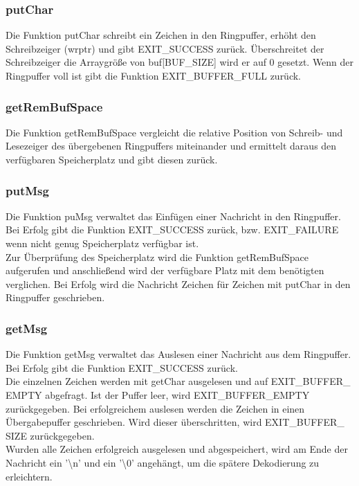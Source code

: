 \documentclass{scrartcl}
\begin{document}
\subsubsection{putChar}
Die Funktion putChar schreibt ein Zeichen in den Ringpuffer, erhöht den Schreibzeiger (wrptr) und gibt EXIT\_SUCCESS zurück.
Überschreitet der Schreibzeiger die Arraygröße von buf[BUF\_SIZE] wird er auf 0 gesetzt. Wenn der Ringpuffer voll ist gibt die Funktion EXIT\_BUFFER\_FULL zurück.



\subsubsection{getRemBufSpace}
Die Funktion getRemBufSpace vergleicht die relative Position von Schreib- und Lesezeiger des übergebenen Ringpuffers miteinander und ermittelt daraus den verfügbaren Speicherplatz und gibt diesen zurück.


\subsubsection{putMsg}
Die Funktion puMsg verwaltet das Einfügen einer Nachricht in den Ringpuffer. Bei Erfolg gibt die Funktion EXIT\_SUCCESS zurück, bzw. EXIT\_FAILURE wenn nicht genug Speicherplatz verfügbar ist. \\
Zur Überprüfung des Speicherplatz wird die Funktion getRemBufSpace aufgerufen und anschließend wird der verfügbare Platz mit dem benötigten verglichen. Bei Erfolg wird die Nachricht Zeichen für Zeichen mit putChar in den Ringpuffer geschrieben.

\subsubsection{getMsg}
Die Funktion getMsg verwaltet das Auslesen einer Nachricht aus dem Ringpuffer. Bei Erfolg gibt die Funktion EXIT\_SUCCESS zurück.\\
Die einzelnen Zeichen werden mit getChar ausgelesen und auf EXIT\_BUFFER\_ EMPTY abgefragt. Ist der Puffer leer, wird EXIT\_BUFFER\_EMPTY zurückgegeben. Bei erfolgreichem auslesen werden die Zeichen in einen Übergabepuffer geschrieben. Wird dieser überschritten, wird EXIT\_BUFFER\_ SIZE zurückgegeben.\\
Wurden alle Zeichen erfolgreich ausgelesen und abgespeichert, wird am Ende der Nachricht ein '\textbackslash n' und ein '\textbackslash 0' angehängt, um die spätere Dekodierung zu erleichtern.
\end{document}
